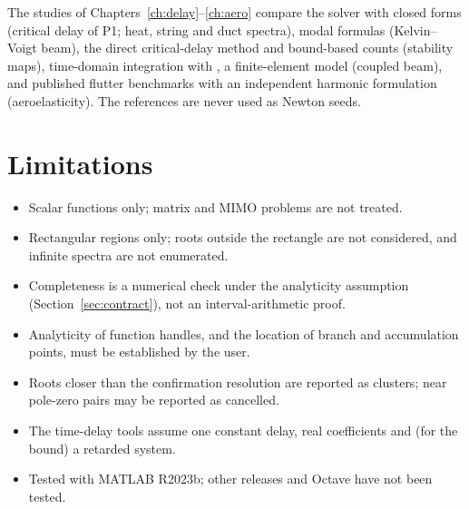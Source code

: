 The studies of Chapters~\ref{ch:delay}--\ref{ch:aero} compare the solver
with closed forms (critical delay of P1; heat, string and duct spectra),
modal formulas (Kelvin--Voigt beam), the direct critical-delay method and
bound-based counts (stability maps), time-domain integration with
, a finite-element model (coupled beam), and published flutter
benchmarks with an independent harmonic formulation (aeroelasticity). The references are
never used as Newton seeds.

\section{Limitations}

\begin{itemize}
  \item Scalar functions only; matrix and MIMO problems are not treated.
  \item Rectangular regions only; roots outside the rectangle are not
        considered, and infinite spectra are not enumerated.
  \item Completeness is a numerical check under the analyticity assumption
        (Section~\ref{sec:contract}), not an interval-arithmetic proof.
  \item Analyticity of function handles, and the location of branch and
        accumulation points, must be established by the user.
  \item Roots closer than the confirmation resolution are reported as
        clusters; near pole-zero pairs may be reported as cancelled.
  \item The time-delay tools assume one constant delay, real coefficients
        and (for the bound) a retarded system.
  \item Tested with MATLAB R2023b; other releases and Octave have not been
        tested.
\end{itemize}
